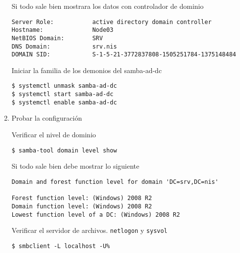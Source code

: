 \documentclass[../main.tex]{subfiles}
\begin{document}
\begin{enumerate}
        Si todo sale bien mostrara los datos con controlador de dominio

        \begin{listing}[H]
\begin{verbatim}
Server Role:           active directory domain controller
Hostname:              Node03
NetBIOS Domain:        SRV
DNS Domain:            srv.nis
DOMAIN SID:            S-1-5-21-3772837808-1505251784-1375148484
\end{verbatim}
\end{listing}

        Iniciar la familia de los demonios del samba-ad-dc

        \begin{listing}[H]
\begin{verbatim}
$ systemctl unmask samba-ad-dc
$ systemctl start samba-ad-dc
$ systemctl enable samba-ad-dc
\end{verbatim}
\end{listing}


  \item Probar la configuración

        Verificar el nivel de dominio

        \begin{listing}[H]
\begin{verbatim}
$ samba-tool domain level show
\end{verbatim}
\end{listing}

        Si todo sale bien debe mostrar lo siguiente

        \begin{listing}[H]
\begin{verbatim}
Domain and forest function level for domain 'DC=srv,DC=nis'

Forest function level: (Windows) 2008 R2
Domain function level: (Windows) 2008 R2
Lowest function level of a DC: (Windows) 2008 R2
\end{verbatim}
\end{listing}

        Verificar el servidor de archivos. \texttt{netlogon}
        y \texttt{sysvol}

        \begin{listing}[H]
\begin{verbatim}
$ smbclient -L localhost -U%
\end{verbatim}
\end{listing}


\end{enumerate}
\end{document}
